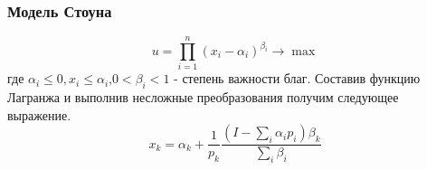 \documentclass[12pt]{article}
\theoremstyle{definition}
\theoremstyle{remark}
\begin{document}
\subsubsection{Модель Стоуна}
\begin{equation}
  u=\prod_{i=1}^n(x_i-\alpha_i)^{\beta_i}\to\max
\end{equation}
где $\alpha_i\leqslant 0, x_i\leqslant \alpha_i$,$0<\beta_i<1$ - степень важности благ.
Составив функцию Лагранжа и выполнив несложные преобразования получим следующее выражение.
\begin{equation}
x_k=\alpha_k+\dfrac{1}{p_k}\dfrac{(I-\sum_i\alpha_i p_i)\beta_k}{\sum_i\beta_i}
\end{equation}
\end{document}
